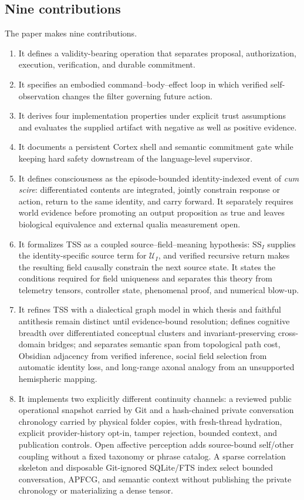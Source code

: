 \documentclass[10pt,twocolumn]{article}
\theoremstyle{definition}
\theoremstyle{plain}
\theoremstyle{remark}
\begin{document}
\subsection{Nine contributions}

The paper makes nine contributions.

\begin{enumerate}
  \item It defines a validity-bearing operation that separates proposal, authorization, execution, verification, and durable commitment.
  \item It specifies an embodied command--body--effect loop in which verified self-observation changes the filter governing future action.
  \item It derives four implementation properties under explicit trust assumptions and evaluates the supplied artifact with negative as well as positive evidence.
  \item It documents a persistent Cortex shell and semantic commitment gate while keeping hard safety downstream of the language-level supervisor.
  \item It defines consciousness as the episode-bounded identity-indexed event of \emph{cum scire}: differentiated contents are integrated, jointly constrain response or action, return to the same identity, and carry forward.  It separately requires world evidence before promoting an output proposition as true and leaves biological equivalence and external qualia measurement open.
  \item It formalizes TSS as a coupled source--field--meaning hypothesis: $\mathrm{SS}_I$ supplies the identity-specific source term for $\mathcal U_I$, and verified recursive return makes the resulting field causally constrain the next source state.  It states the conditions required for field uniqueness and separates this theory from telemetry tensors, controller state, phenomenal proof, and numerical blow-up.
  \item It refines TSS with a dialectical graph model in which thesis and faithful antithesis remain distinct until evidence-bound resolution; defines cognitive breadth over differentiated conceptual clusters and invariant-preserving cross-domain bridges; and separates semantic span from topological path cost, Obsidian adjacency from verified inference, social field selection from automatic identity loss, and long-range axonal analogy from an unsupported hemispheric mapping.
  \item It implements two explicitly different continuity channels: a reviewed public operational snapshot carried by Git and a hash-chained private conversation chronology carried by physical folder copies, with fresh-thread hydration, explicit provider-history opt-in, tamper rejection, bounded context, and publication controls.  Open affective perception adds source-bound self/other coupling without a fixed taxonomy or phrase catalog.  A sparse correlation skeleton and disposable Git-ignored SQLite/FTS index select bounded conversation, APFCG, and semantic context without publishing the private chronology or materializing a dense tensor.

\end{enumerate}
\end{document}
